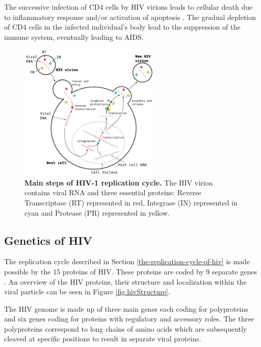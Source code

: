 \documentclass[
  11pt,
  twoside,
  BCOR=10mm,
  listof=totoc]{scrbook}
\newcommand{\extcaption}[2]{
    \caption[#1]{
        \textbf{#1}\newline
        #2
    }
}
\begin{document}
The successive infection of CD4 cells by HIV virions leads to cellular death due to inflammatory response and/or activation of apoptosis \autocite{gougeonDirectIndirectMechanisms1993,vidyavijayanPathophysiologyCD4TCell2017}. The gradual depletion of CD4 cells in the infected individual's body lead to the suppression of the immune system, eventually leading to AIDS.

\begin{figure}
\centering
\includegraphics[width=0.6\textwidth]{./figures/HIV-Intro/HIV-cycle.pdf}
\extcaption{Main steps of HIV-1 replication cycle.}{The HIV virion contains viral RNA and three essential proteins: Reverse Transcriptase (RT) represented in red, Integrase (IN) represented in cyan and Protease (PR) represented in yellow.}
\label{fig:hivCycle}
\end{figure}

\hypertarget{genetics-of-hiv}{%
\subsection{Genetics of HIV}\label{genetics-of-hiv}}

The replication cycle described in Section \ref{the-replication-cycle-of-hiv} is made possible by the 15 proteins of HIV. These proteins are coded by 9 separate genes \autocite{frankelHIV1FifteenProteins1998}. An overview of the HIV proteins, their structure and localization within the viral particle can be seen in Figure \ref{fig:hivStructure}.

The HIV genome is made up of three main genes each coding for polyproteins and six genes coding for proteins with regulatory and accessory roles. The three polyproteins correspond to long chains of amino acids which are subsequently cleaved at specific positions to result in separate viral proteins.
\end{document}
